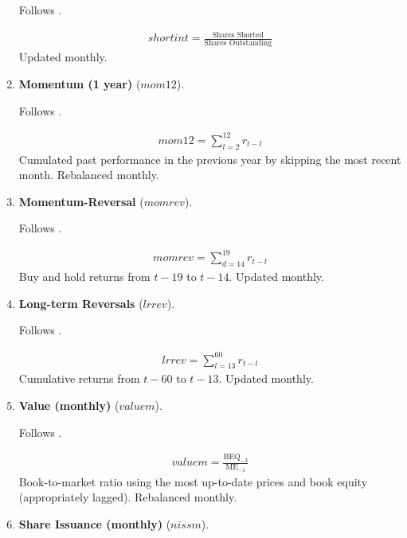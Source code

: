 \begin{enumerate}
	Follows . 
	
	\begin{align*}
		shortint = \frac{ \text{Shares Shorted} }{ \text{Shares Outstanding} }
	\end{align*}	
	Updated monthly.
	
	
	
	\item \textbf{Momentum (1 year)} ($mom12$). 
	
	Follows . 
	
	\begin{align*}
		mom12 = \sum_{l=2}^{12} r_{t-l}
	\end{align*}
	Cumulated past performance in the previous year by skipping the most recent month. Rebalanced monthly.
	
	
	
	\item \textbf{Momentum-Reversal} ($momrev$). 
	
	Follows . 
	
	\begin{align*}
		momrev = \sum_{d=14}^{19} r_{t-l}
	\end{align*}
	Buy and hold returns from $t-19$ to $t-14$. Updated monthly.
	
	
	
	\item \textbf{Long-term Reversals} ($lrrev$). 
	
	Follows . 
	
	\begin{align*}
		lrrev = \sum_{l=13}^{60} r_{t-l} 
	\end{align*}
	Cumulative returns from $t-60$ to $t-13$. Updated monthly.
	
	
	
	\item \textbf{Value (monthly)} ($valuem$). 
	
	Follows . 
	
	\begin{align*}
		valuem = \frac{ \mathrm{BEQ}_{-3} }{ \mathrm{ME}_{-1} }
	\end{align*}
	Book-to-market ratio using the most up-to-date prices and book equity (appropriately lagged). Rebalanced monthly.
	
	
	
	\item \textbf{Share Issuance (monthly)} ($nissm$).
	

\end{enumerate}
